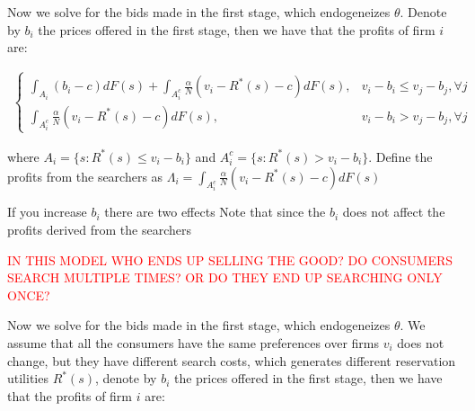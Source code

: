 \documentclass[12pt]{article}
\theoremstyle{plain}
\theoremstyle{plain}
\begin{document}
\vspace{2cm}


Now we solve for the bids made in the first stage, which endogeneizes $\theta$. Denote by $b_i$ the prices offered in the first stage, then we have that the profits of firm $i$ are: 

\begin{align*}
\begin{cases}
           \int_{A_i} (b_i-c) dF(s) + \int_{A_i^c} \frac{\alpha}{N} ( v_i - R^*(s)- c) dF(s), & v_i - b_i \leq v_j - b_j, \forall j \\
           \int_{A_i^c} \frac{\alpha}{N} ( v_i - R^*(s)- c) dF(s) , &  v_i - b_i > v_j - b_j, \forall j
\end{cases}
\end{align*}

where $A_i = \{s: R^*(s) \leq v_i-b_i\}$ and $A_i^c = \{s: R^*(s) > v_i-b_i\}$. Define the profits from the searchers as $\Lambda_i = \int_{A_i^c} \frac{\alpha}{N} ( v_i - R^*(s)- c) dF(s)$

\vspace{2cm}

If you increase $b_i$ there are two effects 
Note that since the $b_i$ does not affect the profits derived from the searchers




\vspace{3cm}

\textcolor{red}{IN THIS MODEL WHO ENDS UP SELLING THE GOOD? DO CONSUMERS SEARCH MULTIPLE TIMES? OR DO THEY END UP SEARCHING ONLY ONCE?}






Now we solve for the bids made in the first stage, which endogeneizes $\theta$. We assume that all the consumers have the same preferences over firms $v_i$ does not change, but they have different search costs, which generates different reservation utilities $R^*(s)$, denote by $b_i$ the prices offered in the first stage, then we have that the profits of firm $i$ are: 
\end{document}

